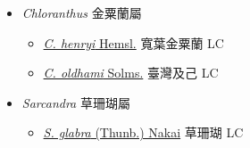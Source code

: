 
  \begin{itemize}
 \item[] \textit{Chloranthus} 金粟蘭屬
                    
  \begin{itemize}
        \item[] \href{http://www.theplantlist.org/tpl1.1/search?q=Chloranthus+henryi}{\textit{C. henryi} Hemsl.}   寬葉金粟蘭 LC
        \item[] \href{http://www.theplantlist.org/tpl1.1/search?q=Chloranthus+oldhami}{\textit{C. oldhami} Solms.}   臺灣及己 LC
  \end{itemize}
 \item[] \textit{Sarcandra} 草珊瑚屬
                    
  \begin{itemize}
        \item[] \href{http://www.theplantlist.org/tpl1.1/search?q=Sarcandra+glabra}{\textit{S. glabra} (Thunb.) Nakai}   草珊瑚 LC
  \end{itemize}
  \end{itemize}

